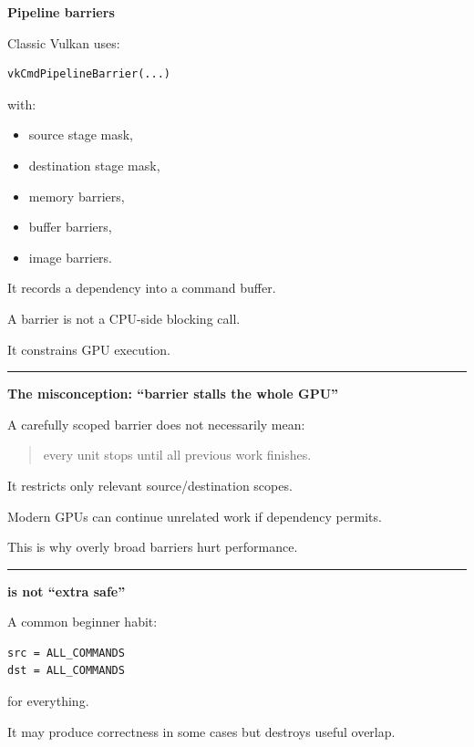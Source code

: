 \textbf{Pipeline barriers}

Classic Vulkan uses:

\begin{verbatim}
vkCmdPipelineBarrier(...)
\end{verbatim}

with:

\begin{itemize}
\tightlist
\item
  source stage mask,
\item
  destination stage mask,
\item
  memory barriers,
\item
  buffer barriers,
\item
  image barriers.
\end{itemize}

It records a dependency into a command buffer.

A barrier is not a CPU-side blocking call.

It constrains GPU execution.

\begin{center}\rule{0.5\linewidth}{0.5pt}\end{center}

\textbf{The misconception: ``barrier stalls the whole GPU''}

A carefully scoped barrier does not necessarily mean:

\begin{quote}
every unit stops until all previous work finishes.
\end{quote}

It restricts only relevant source/destination scopes.

Modern GPUs can continue unrelated work if dependency permits.

This is why overly broad barriers hurt performance.

\begin{center}\rule{0.5\linewidth}{0.5pt}\end{center}

\textbf{ is not ``extra safe''}

A common beginner habit:

\begin{verbatim}
src = ALL_COMMANDS
dst = ALL_COMMANDS
\end{verbatim}

for everything.

It may produce correctness in some cases but destroys useful overlap.

